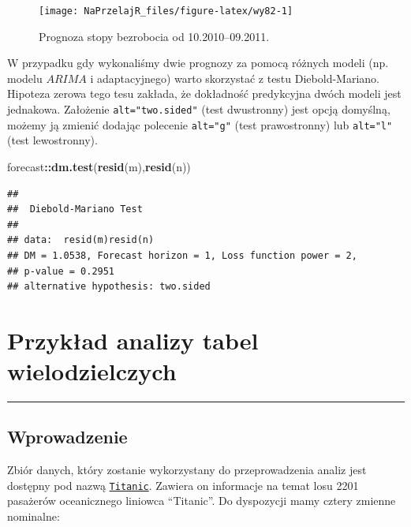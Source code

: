 \documentclass[polish,]{book}
\newenvironment{Shaded}{\begin{snugshade}}{\end{snugshade}}
\newcommand{\KeywordTok}[1]{\textcolor[rgb]{0.13,0.29,0.53}{\textbf{#1}}}
\newcommand{\NormalTok}[1]{#1}
\newcommand{\OperatorTok}[1]{\textcolor[rgb]{0.81,0.36,0.00}{\textbf{#1}}}
\begin{document}
\begin{figure}[h]

{\centering \texttt{[image: NaPrzelajR\_files/figure-latex/wy82-1]} 

}

\caption{Prognoza stopy bezrobocia od 10.2010–09.2011.}\label{fig:wy82}
\end{figure}

W przypadku gdy wykonaliśmy dwie prognozy za pomocą różnych modeli (np.
modelu \(ARIMA\) i adaptacyjnego) warto skorzystać z testu Diebold-Mariano. Hipoteza zerowa tego tesu zakłada, że dokładność predykcyjna dwóch modeli jest jednakowa. Założenie \texttt{alt="two.sided"} (test dwustronny) jest opcją domyślną, możemy
ją zmienić dodając polecenie \texttt{alt="g"} (test prawostronny) lub \texttt{alt="l"} (test lewostronny).

\begin{Shaded}
\begin{Highlighting}[]
\NormalTok{forecast}\OperatorTok{::}\KeywordTok{dm.test}\NormalTok{(}\KeywordTok{resid}\NormalTok{(m),}\KeywordTok{resid}\NormalTok{(n))}
\end{Highlighting}
\end{Shaded}

\begin{verbatim}
## 
##  Diebold-Mariano Test
## 
## data:  resid(m)resid(n)
## DM = 1.0538, Forecast horizon = 1, Loss function power = 2,
## p-value = 0.2951
## alternative hypothesis: two.sided
\end{verbatim}

\hypertarget{part_8}{%
\chapter{Przykład analizy tabel wielodzielczych}\label{part_8}}

\begin{center}\rule{0.5\linewidth}{\linethickness}\end{center}

\hypertarget{part_81}{%
\section{Wprowadzenie}\label{part_81}}

Zbiór danych, który zostanie wykorzystany do przeprowadzenia analiz jest dostępny
pod nazwą \href{https://rdrr.io/r/datasets/Titanic.html}{\texttt{Titanic}}. Zawiera on informacje na temat losu 2201 pasażerów
oceanicznego liniowca ``Titanic''. Do dyspozycji mamy cztery zmienne nominalne:
\end{document}
